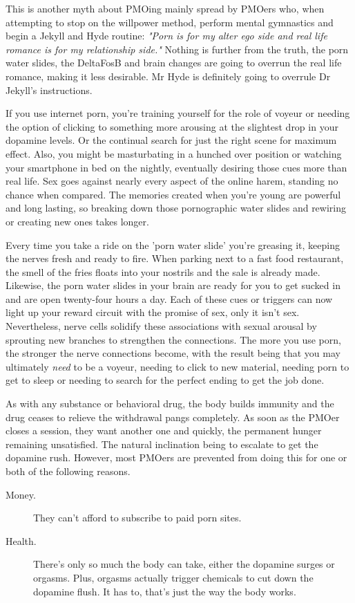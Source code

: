 \documentclass[easypeasy.tex]{subfiles}
\begin{document}
This is another myth about PMOing mainly spread by PMOers who, when attempting to stop on the willpower method, perform mental gymnastics and begin a Jekyll and Hyde routine: \textit{"Porn is for my alter ego side and real life romance is for my relationship side."} Nothing is further from the truth, the porn water slides, the DeltaFosB and brain changes are going to overrun the real life romance, making it less desirable. Mr Hyde is definitely going to overrule Dr Jekyll's instructions.

If you use internet porn, you're training yourself for the role of voyeur or needing the option of clicking to something more arousing at the slightest drop in your dopamine levels. Or the continual search for just the right scene for maximum effect. Also, you might be masturbating in a hunched over position or watching your smartphone in bed on the nightly, eventually desiring those cues more than real life. Sex goes against nearly every aspect of the online harem, standing no chance when compared. The memories created when you're young are powerful and long lasting, so breaking down those pornographic water slides and rewiring or creating new ones takes longer.

Every time you take a ride on the 'porn water slide' you're greasing it, keeping the nerves fresh and ready to fire. When parking next to a fast food restaurant, the smell of the fries floats into your nostrils and the sale is already made. Likewise, the porn water slides in your brain are ready for you to get sucked in and are open twenty-four hours a day. Each of these cues or triggers can now light up your reward circuit with the promise of sex, only it isn't sex. Nevertheless, nerve cells solidify these associations with sexual arousal by sprouting new branches to strengthen the connections. The more you use porn, the stronger the nerve connections become, with the result being that you may ultimately \textit{need} to be a voyeur, needing to click to new material, needing porn to get to sleep or needing to search for the perfect ending to get the job done.

As with any substance or behavioral drug, the body builds immunity and the drug ceases to relieve the withdrawal pangs completely. As soon as the PMOer closes a session, they want another one and quickly, the permanent hunger remaining unsatisfied. The natural inclination being to escalate to get the dopamine rush. However, most PMOers are prevented from doing this for one or both of the following reasons.
  \begin{description}
    \item [Money.] They can't afford to subscribe to paid porn sites.
    \item [Health.]There's only so much the body can take, either the dopamine surges or orgasms. Plus, orgasms actually trigger chemicals to cut down the dopamine flush. It has to, that's just the way the body works.
  \end{description}
\end{document}
